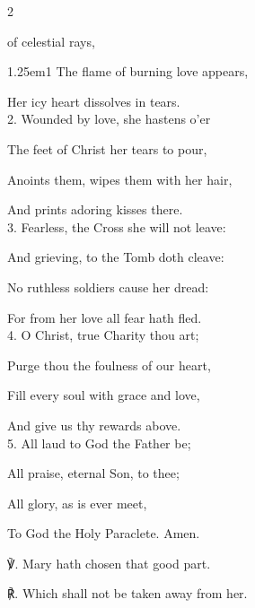 \begin{paracol}{2}
\sloppy


\vspace{-1\baselineskip}


\firstEvensong
{}

\firstEvensongHymn
{} of celestial rays,


\begin{hangparas}{1.25em}{1}
The flame of burning love appears,

Her icy heart dissolves in tears.\\

2. Wounded by love, she hastens o'er

The feet of Christ her tears to pour,

Anoints them, wipes them with her hair,

And prints adoring kisses there.\\

3. Fearless, the Cross she will not leave:

And grieving, to the Tomb doth cleave:

No ruthless soldiers cause her dread:

For from her love all fear hath fled.\\

4. O Christ, true Charity thou art;

Purge thou the foulness of our heart,

Fill every soul with grace and love,

And give us thy rewards above.\\

5. All laud to God the Father be;

All praise, eternal Son, to thee;

All glory, as is ever meet,

To God the Holy Paraclete. Amen.\\
\end{hangparas}

℣. Mary hath chosen that good part.

℟. Which shall not be taken away from her.


\end{paracol}
